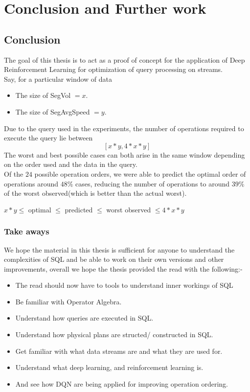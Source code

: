 \chapter{Conclusion and Further work}
\label{chapter:Conclusion_and_further_work}
\thispagestyle{myheadings}

\graphicspath{}

\section{Conclusion}
The goal of this thesis is to act as a proof of concept for the application of Deep Reinforcement Learning for optimization of query processing on streams.\\
Say, for a particular window of data 
\begin{itemize}
    \item The size of SegVol $=x$.
    \item The size of SegAvgSpeed $=y$.
\end{itemize}
Due to the query used in the experiments, the number of operations required to execute the query lie between 
$$[x*y,4*x*y]$$ 
The worst and best possible cases can both arise in the same window depending on the order used and the data in the query.\\
Of the $24$ possible operation orders, we were able to predict the optimal order of operations around $48\%$ cases, reducing the number of operations to around $39\%$ of the worst observed(which is better than the actual worst).
\begin{center}
$x*y \leq$ optimal $\leq$ predicted $\leq$ worst observed $\leq 4*x*y$
\end{center}

\subsection{Take aways}
We hope the material in this thesis is sufficient for anyone to understand the complexities of SQL and be able to work on their own versions and other improvements, overall we hope the thesis provided the read with the following:-
\begin{itemize}
    \item The read should now have to tools to understand inner workings of SQL
    \item Be familiar with Operator Algebra.
    \item Understand how queries are executed in SQL.
    \item Understand how physical plans are structed/ constructed in SQL.
    \item Get familiar with what data streams are and what they are used for.
    \item Understand what deep learning, and reinforcement learning is.
    \item And see how DQN are being applied for improving operation ordering. 
\end{itemize}
